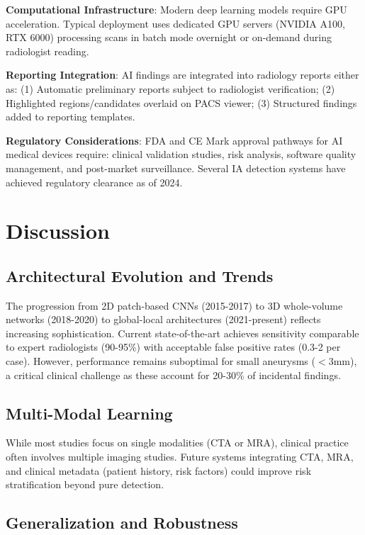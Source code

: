 \documentclass[conference]{IEEEtran}
\begin{document}
\textbf{Computational Infrastructure}: Modern deep learning models require GPU acceleration. Typical deployment uses dedicated GPU servers (NVIDIA A100, RTX 6000) processing scans in batch mode overnight or on-demand during radiologist reading.

\textbf{Reporting Integration}: AI findings are integrated into radiology reports either as: (1) Automatic preliminary reports subject to radiologist verification; (2) Highlighted regions/candidates overlaid on PACS viewer; (3) Structured findings added to reporting templates.

\textbf{Regulatory Considerations}: FDA and CE Mark approval pathways for AI medical devices require: clinical validation studies, risk analysis, software quality management, and post-market surveillance. Several IA detection systems have achieved regulatory clearance as of 2024.

\section{Discussion}

\subsection{Architectural Evolution and Trends}

The progression from 2D patch-based CNNs (2015-2017) to 3D whole-volume networks (2018-2020) to global-local architectures (2021-present) reflects increasing sophistication. Current state-of-the-art achieves sensitivity comparable to expert radiologists (90-95\%) with acceptable false positive rates (0.3-2 per case). However, performance remains suboptimal for small aneurysms ($<$3mm), a critical clinical challenge as these account for 20-30\% of incidental findings.

\subsection{Multi-Modal Learning}

While most studies focus on single modalities (CTA or MRA), clinical practice often involves multiple imaging studies. Future systems integrating CTA, MRA, and clinical metadata (patient history, risk factors) could improve risk stratification beyond pure detection.

\subsection{Generalization and Robustness}
\end{document}
